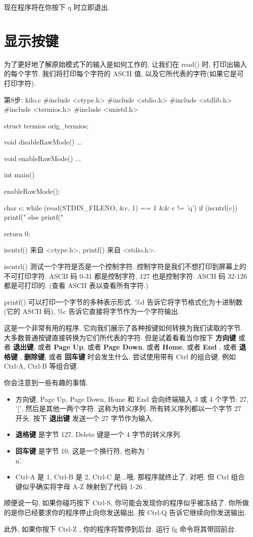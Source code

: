 \documentclass[lang=cn,newtx,10pt,scheme=chinese]{elegantbook}
\begin{document}
现在程序将在你按下 q 时立即退出.

\section{显示按键}

为了更好地了解原始模式下的输入是如何工作的, 让我们在 read() 时, 打印出输入的每个字节. 我们将打印每个字符的 ASCII 值, 以及它所代表的字符(如果它是可打印字符).

\begin{mycode}{第8步: kilo.c}
#include <ctype.h>
#include <stdio.h>
#include <stdlib.h>
#include <termios.h>
#include <unistd.h>

struct termios orig_termios;

void disableRawMode() { ... }

void enableRawMode() { ... }

int main() {
  enableRawMode();

  char c;
  while (read(STDIN_FILENO, &c, 1) == 1 && c != 'q') {
    if (iscntrl(c)) {
      printf("%
    } else {
      printf("%
    }
  }

  return 0;
}
\end{mycode}

iscntrl() 来自 <ctype.h>, printf() 来自 <stdio.h>.

iscntrl() 测试一个字符是否是一个控制字符. 控制字符是我们不想打印到屏幕上的不可打印字符. ASCII 码 0-31 都是控制字符, 127 也是控制字符. ASCII 码 32-126 都是可打印的. (查看 ASCII 表以查看所有字符.)

printf() 可以打印一个字节的多种表示形式. \%d 告诉它将字节格式化为十进制数(它的 ASCII 码), \%c 告诉它直接将字节作为一个字符输出.

这是一个非常有用的程序. 它向我们展示了各种按键如何转换为我们读取的字节. 大多数普通按键直接转换为它们所代表的字符. 但是试着看看当你按下 \textbf{方向键} 或者 \textbf{退出键}, 或者 \textbf{Page Up}, 或者 \textbf{Page Down}, 或者 \textbf{Home}, 或者 \textbf{End} , 或者 \textbf{退格键} , \textbf{删除键}, 或者 \textbf{回车键} 时会发生什么. 尝试使用带有 Ctrl 的组合键, 例如 Ctrl-A, Ctrl-B 等组合键.

你会注意到一些有趣的事情.

\begin{itemize}
\item 方向键, Page Up, Page Down, Home 和 End 会向终端输入 3 或 4 个字节: 27, '[', 然后是其他一两个字符. 这称为转义序列. 所有转义序列都以一个字节 27 开头. 按下 \textbf{退出键} 发送一个 27 字节作为输入.
\item \textbf{退格键} 是字节 127. Delete 键是一个 4 字节的转义序列.
\item \textbf{回车键} 是字节 10, 这是一个换行符, 也称为 '\\n'.
\item Ctrl-A 是 1, Ctrl-B 是 2, Ctrl-C 是...哦, 那程序就终止了, 对吧. 但 Ctrl 组合键似乎确实将字母 A-Z 映射到了代码 1-26 .
\end{itemize}

顺便说一句, 如果你碰巧按下 Ctrl-S, 你可能会发现你的程序似乎被冻结了. 你所做的是你已经要求你的程序停止向你发送输出. 按 Ctrl-Q 告诉它继续向你发送输出.

此外, 如果你按下 Ctrl-Z , 你的程序将暂停到后台. 运行 fg 命令将其带回前台.
\end{document}

